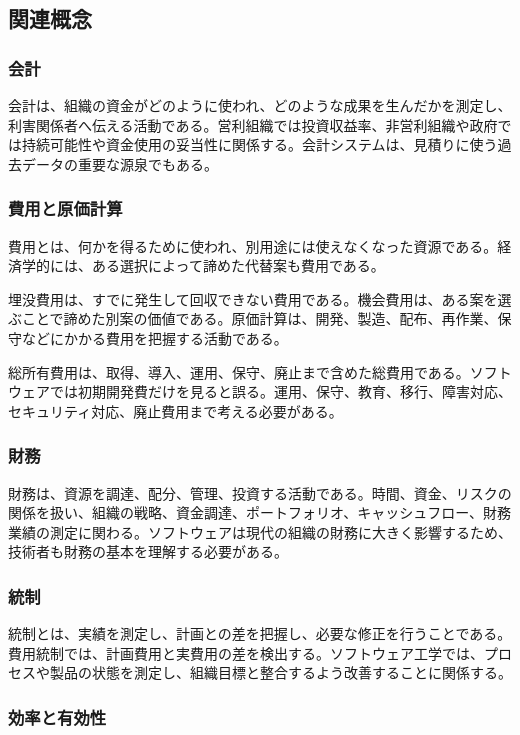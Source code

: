 \subsection{関連概念}

\subsubsection{会計}

会計は、組織の資金がどのように使われ、どのような成果を生んだかを測定し、利害関係者へ伝える活動である。営利組織では投資収益率、非営利組織や政府では持続可能性や資金使用の妥当性に関係する。会計システムは、見積りに使う過去データの重要な源泉でもある。

\subsubsection{費用と原価計算}

費用とは、何かを得るために使われ、別用途には使えなくなった資源である。経済学的には、ある選択によって諦めた代替案も費用である。

埋没費用は、すでに発生して回収できない費用である。機会費用は、ある案を選ぶことで諦めた別案の価値である。原価計算は、開発、製造、配布、再作業、保守などにかかる費用を把握する活動である。

総所有費用は、取得、導入、運用、保守、廃止まで含めた総費用である。ソフトウェアでは初期開発費だけを見ると誤る。運用、保守、教育、移行、障害対応、セキュリティ対応、廃止費用まで考える必要がある。

\subsubsection{財務}

財務は、資源を調達、配分、管理、投資する活動である。時間、資金、リスクの関係を扱い、組織の戦略、資金調達、ポートフォリオ、キャッシュフロー、財務業績の測定に関わる。ソフトウェアは現代の組織の財務に大きく影響するため、技術者も財務の基本を理解する必要がある。

\subsubsection{統制}

統制とは、実績を測定し、計画との差を把握し、必要な修正を行うことである。費用統制では、計画費用と実費用の差を検出する。ソフトウェア工学では、プロセスや製品の状態を測定し、組織目標と整合するよう改善することに関係する。

\subsubsection{効率と有効性}

